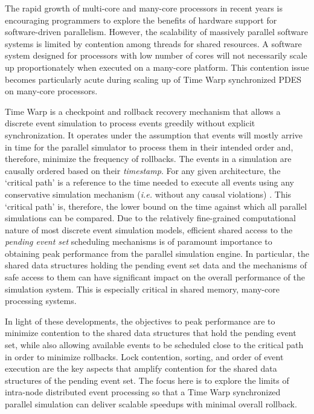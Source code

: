 \documentclass[11pt]{book}
\begin{document}
The rapid growth of multi-core and many-core processors in recent years is encouraging programmers to explore
the benefits of hardware support for software-driven parallelism.  However, the scalability of massively
parallel software systems is limited by contention among threads for shared resources.  A software system
designed for processors with low number of cores will not necessarily scale up proportionately when executed
on a many-core platform.  This contention issue becomes particularly acute during scaling up of Time Warp
synchronized \cite{jefferson-85, jefferson-87} PDES on many-core processors.

Time Warp is a checkpoint and rollback recovery mechanism that allows a discrete event simulation to process
events greedily without explicit synchronization.  It operates under the assumption that events will mostly
arrive in time for the parallel simulator to process them in their intended order and, therefore, minimize the
frequency of rollbacks.  The events in a simulation are causally ordered based on their \emph{timestamp}.  For
any given architecture, the `critical path' is a reference to the time needed to execute all events using any
conservative simulation mechanism (\emph{i.e.} without any causal violations) \cite{jefferson-91}. This
`critical path' is, therefore, the lower bound on the time against which all parallel simulations can be
compared.  Due to the relatively fine-grained computational nature of most discrete event simulation models,
efficient shared access to the \emph{pending event set} scheduling mechanisms is of paramount importance to
obtaining peak performance from the parallel simulation engine.  In particular, the shared data structures
holding the pending event set data and the mechanisms of safe access to them can have significant impact on
the overall performance of the simulation system.  This is especially critical in shared memory, many-core
processing systems.

In light of these developments, the objectives to peak performance are to minimize contention to the shared
data structures that hold the pending event set, while also allowing available events to be scheduled close to
the critical path in order to minimize rollbacks.  Lock contention, sorting, and order of event execution are
the key aspects that amplify contention for the shared data structures of the pending event set.  The focus
here is to explore the limits of intra-node distributed event processing so that a Time Warp synchronized
parallel simulation can deliver scalable speedups with minimal overall rollback.
\end{document}
